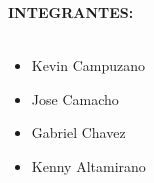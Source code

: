 \documentclass[14pt]{article}
\begin{document}
\begin{center}
\begin{huge}
\textbf{INTEGRANTES:}\\\
\end{huge}
\end{center}

\begin{itemize}
\item Kevin Campuzano
\item Jose Camacho
\item Gabriel Chavez
\item Kenny Altamirano\\\\\\\\
\end{itemize}
\end{document}
